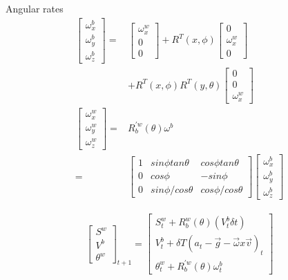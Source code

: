 \documentclass[conference]{IEEEtran}
\begin{document}
Angular rates
\begin{align}
\begin{bmatrix} \omega_x^b\\ \omega_y^b\\ \omega_z^b \end{bmatrix} =& \begin{bmatrix} \omega_x^w\\ 0\\ 0\end{bmatrix} + R^T(x, \phi) \begin{bmatrix} 0\\ \omega_x^w\\ 0\end{bmatrix} \\
& + R^T(x, \phi) R^T(y, \theta) \begin{bmatrix} 0\\ 0\\ \omega_x^w \end{bmatrix} \\
\begin{bmatrix} \omega_x^w\\ \omega_y^w\\ \omega_z^w \end{bmatrix} =& R_b^{'w} (\theta) \omega^b\\
=& \begin{bmatrix} 1& sin\phi tan\theta& cos\phi tan\theta\\
			     0& cos \phi& -sin\phi\\
			    0& sin\phi / cos \theta& cos\phi/cos\theta \end{bmatrix} \begin{bmatrix} \omega_x^b\\ \omega_y^b\\ \omega_z^b \end{bmatrix}  \label{angular_rates_world_eq}
\end{align}

\begin{align}
\begin{bmatrix} S^w\\ V^b\\ \theta^w \end{bmatrix}_{t+1} = \begin{bmatrix} S_t^w + R_b^w (\theta) (V_t^b \delta t) \\
														      V_t^b + \delta T (a_t - \vec{g} - \vec{\omega} x \vec{v})_t \\
														      \theta_t^w + R^{'w}_b (\theta) \omega_t^b \end{bmatrix}
\end{align}
\end{document}
